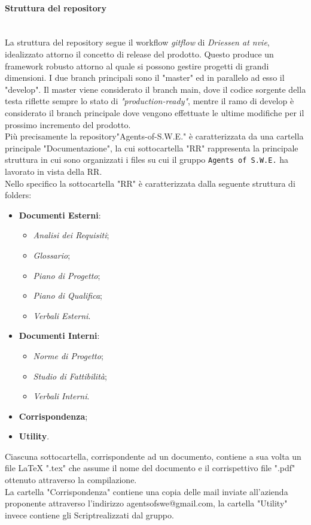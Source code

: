 \paragraph{Struttura del repository} \-\\ 
La struttura del repository segue il workflow \textit{gitflow} di \textit{Driessen at nvie}, idealizzato attorno il concetto di release del prodotto. Questo produce un framework robusto attorno al quale si possono gestire progetti di grandi dimensioni. I due branch principali sono il "master" ed in parallelo ad esso il "develop". 
Il master viene considerato il branch main, dove il codice sorgente della testa riflette sempre lo stato di \textit{"production-ready"},
mentre il ramo di develop è considerato il branch principale dove vengono effettuate le ultime modifiche per il prossimo incremento del prodotto. ~\\
Più precisamente la repository\glossario "Agents-of-S.W.E." è caratterizzata da una cartella principale "Documentazione", la cui sottocartella "RR" rappresenta la principale struttura in cui sono organizzati i files su cui il gruppo \texttt{Agents of S.W.E.} ha lavorato in vista della RR.\\
	Nello specifico la sottocartella "RR" è caratterizzata dalla seguente struttura di folders:
	\begin{itemize}
	\item \textbf{Documenti Esterni}:
		\begin{itemize}
		\item \textit{Analisi dei Requisiti};
		\item \textit{Glossario};
		\item \textit{Piano di Progetto};
		\item \textit{Piano di Qualifica};
		\item \textit{Verbali Esterni}.
		\end{itemize}
	\item \textbf{Documenti Interni}:
		\begin{itemize}
		\item \textit{Norme di Progetto};
		\item \textit{Studio di Fattibilità};
		\item \textit{Verbali Interni}.
		\end{itemize}
	\item \textbf{Corrispondenza};
	\item \textbf{Utility}.
	\end{itemize}
	Ciascuna sottocartella, corrispondente ad un documento, contiene a sua volta un file LaTeX ".tex" che assume il nome del documento e il corrispettivo file ".pdf" ottenuto attraverso la compilazione.\\
	La cartella "Corrispondenza" contiene una copia delle mail inviate all'azienda proponente attraverso l'indirizzo agentsofswe@gmail.com, la cartella "Utility" invece contiene gli Script\glossario realizzati dal gruppo.

